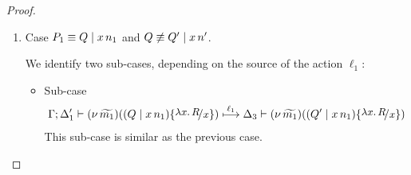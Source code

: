 \begin{proof}
\begin{enumerate}
		\item	Case $P_1 \equiv Q \;|\; x\, {n_1}$ and $Q \not\equiv Q' \;|\; x\, {n'}$.

				We identify two sub-cases, depending on the source of the action $\ell_1$:
				\begin{itemize}
					\item	Sub-case
							\begin{eqnarray*}
								\horel{\Gamma}{\Delta_1'}{\newsp{\widetilde{m_1}}{(Q \Par \appl{x}{n_1}) \subst{{\abs{x}{R}}}{x} }}
								{\hby{\ell_1}}
								{\Delta_3}{\newsp{\widetilde{m_1}}{(Q' \Par \appl{x}{n_1}) \subst{{\abs{x}{R}}}{x} }}
							\end{eqnarray*}
							This sub-case is similar as the previous case.


\end{itemize}
\end{enumerate}
\end{proof}
